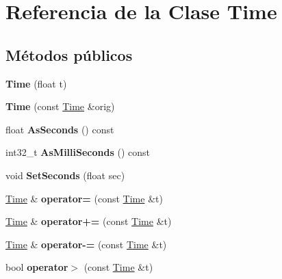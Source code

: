 \hypertarget{classTime}{\section{Referencia de la Clase Time}
\label{classTime}
}
\subsection*{Métodos públicos}
\begin{DoxyCompactItemize}
\item 
\hypertarget{classTime_afa2ac6347fceedd7a10f847504f5fdef}{{\bfseries Time} (float t)}\label{classTime_afa2ac6347fceedd7a10f847504f5fdef}

\item 
\hypertarget{classTime_a36514b10f14cbc5425e37ea16bb1ad5b}{{\bfseries Time} (const \hyperlink{classTime}{Time} \&orig)}\label{classTime_a36514b10f14cbc5425e37ea16bb1ad5b}

\item 
\hypertarget{classTime_a87ed4eafd5b8a63df39589c66a2ef2ca}{float {\bfseries As\-Seconds} () const }\label{classTime_a87ed4eafd5b8a63df39589c66a2ef2ca}

\item 
\hypertarget{classTime_a37f9b2a4905c4a5a8ff577be28b30141}{int32\-\_\-t {\bfseries As\-Milli\-Seconds} () const }\label{classTime_a37f9b2a4905c4a5a8ff577be28b30141}

\item 
\hypertarget{classTime_ac692565c7a6c518c67779b406e9c7557}{void {\bfseries Set\-Seconds} (float sec)}\label{classTime_ac692565c7a6c518c67779b406e9c7557}

\item 
\hypertarget{classTime_a985babec126c51a80db83455ce70b1c2}{\hyperlink{classTime}{Time} \& {\bfseries operator=} (const \hyperlink{classTime}{Time} \&t)}\label{classTime_a985babec126c51a80db83455ce70b1c2}

\item 
\hypertarget{classTime_a375bf61e99fe0055a401df04a2551939}{\hyperlink{classTime}{Time} \& {\bfseries operator+=} (const \hyperlink{classTime}{Time} \&t)}\label{classTime_a375bf61e99fe0055a401df04a2551939}

\item 
\hypertarget{classTime_a91b5ebd30b5fd7950622773e99cfac31}{\hyperlink{classTime}{Time} \& {\bfseries operator-\/=} (const \hyperlink{classTime}{Time} \&t)}\label{classTime_a91b5ebd30b5fd7950622773e99cfac31}

\item 
\hypertarget{classTime_a03b0960f5169ce6fdb1cf53ad8e6cbba}{bool {\bfseries operator$>$} (const \hyperlink{classTime}{Time} \&t)}\label{classTime_a03b0960f5169ce6fdb1cf53ad8e6cbba}

\end{DoxyCompactItemize}
